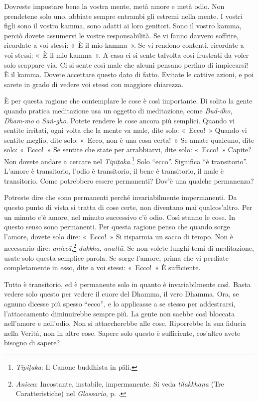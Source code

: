 Dovreste impostare bene la vostra mente, metà amore e metà odio. Non
prendetene solo uno, abbiate sempre entrambi gli estremi nella mente. I
vostri figli sono il vostro kamma, sono adatti ai loro genitori.
Sono il vostro kamma, perciò dovete assumervi le vostre
responsabilità. Se vi fanno davvero soffrire, ricordate a voi stessi:
«~È il mio kamma~». Se vi rendono contenti, ricordate a voi
stessi: «~È il mio kamma~». A casa ci si sente talvolta così
frustrati da voler solo scappare via. Ci si sente così male che alcuni
pensano perfino di impiccarsi! È il kamma. Dovete accettare
questo dato di fatto. Evitate le cattive azioni, e poi sarete in grado
di vedere voi stessi con maggiore chiarezza.

È per questa ragione che contemplare le cose è così importante. Di
solito la gente quando pratica meditazione usa un oggetto di
meditazione, come \emph{Bud-dho}, \emph{Dham-mo} o \emph{Saṅ-gho}.
Potete rendere le cose ancora più semplici. Quando vi sentite irritati,
ogni volta che la mente va male, dite solo: «~Ecco!~» Quando vi sentite
meglio, dite solo: «~Ecco, non è una cosa certa!~» Se amate qualcuno,
dite solo: «~Ecco!~» Se sentite che state per arrabbiarvi, dite solo:
«~Ecco!~» Capite? Non dovete andare a cercare nel
\emph{Tipiṭaka}.\footnote{\emph{Tipiṭaka}: Il Canone buddhista in pāli.}
Solo ``ecco''. Significa ``è transitorio''. L'amore è transitorio,
l'odio è transitorio, il bene è transitorio, il male è transitorio. Come
potrebbero essere permanenti? Dov'è una qualche permanenza?

Potreste dire che sono permanenti perché invariabilmente impermanenti.
Da questo punto di vista si tratta di cose certe, non diventano mai
qualcos'altro. Per un minuto c'è amore, nel minuto successivo c'è odio.
Così stanno le cose. In questo senso sono permanenti. Per questa ragione
penso che quando sorge l'amore, dovete solo dire: «~Ecco!~» Si risparmia
un sacco di tempo. Non è necessario dire: \emph{aniccā},\footnote{\emph{Anicca}:
  Incostante, instabile, impermanente. Si veda \emph{tilakkhaṇa} (Tre
  Caratteristiche) nel \emph{Glossario}, p. \pageref{glossary-tilakkhana}.} \emph{dukkha}, \emph{anattā}.
Se non volete lunghi temi di meditazione, usate solo questa semplice
parola. Se sorge l'amore, prima che vi perdiate completamente in esso,
dite a voi stessi: «~Ecco!~» È sufficiente.

Tutto è transitorio, ed è permanente solo in quanto è invariabilmente
così. Basta vedere solo questo per vedere il cuore del Dhamma, il vero
Dhamma. Ora, se ognuno dicesse più spesso ``ecco'', e lo applicasse a se
stesso per addestrarsi, l'attaccamento diminuirebbe sempre più. La gente
non saebbe così bloccata nell'amore e nell'odio. Non si attaccherebbe
alle cose. Riporrebbe la sua fiducia nella Verità, non in altre cose.
Sapere solo questo è sufficiente, cos'altro avete bisogno di sapere?

